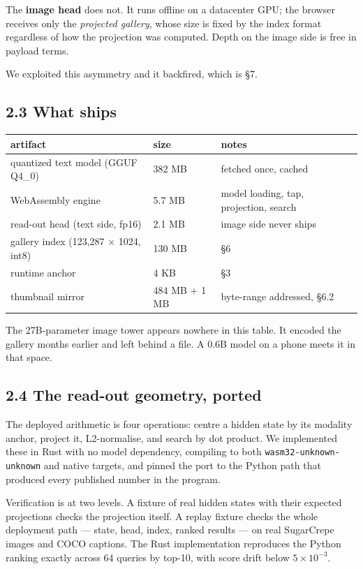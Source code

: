 \documentclass[
  11pt,
]{article}
\newcounter{none} %
\begin{document}
The \textbf{image head} does not. It runs offline on a datacenter GPU;
the browser receives only the \emph{projected gallery}, whose size is
fixed by the index format regardless of how the projection was computed.
Depth on the image side is free in payload terms.

We exploited this asymmetry and it backfired, which is §7.

\subsection{2.3 What ships}\label{what-ships}

{\def\LTcaptype{none} %
\begin{longtable}[]{@{}lll@{}}
\toprule\noalign{}
artifact & size & notes \\
\midrule\noalign{}
\endhead
\bottomrule\noalign{}
\endlastfoot
quantized text model (GGUF Q4\_0) & 382 MB & fetched once, cached \\
WebAssembly engine & 5.7 MB & model loading, tap, projection, search \\
read-out head (text side, fp16) & 2.1 MB & image side never ships \\
gallery index (123,287 × 1024, int8) & 130 MB & §6 \\
runtime anchor & 4 KB & §3 \\
thumbnail mirror & 484 MB + 1 MB & byte-range addressed, §6.2 \\
\end{longtable}
}

The 27B-parameter image tower appears nowhere in this table. It encoded
the gallery months earlier and left behind a file. A 0.6B model on a
phone meets it in that space.

\subsection{2.4 The read-out geometry,
ported}\label{the-read-out-geometry-ported}

The deployed arithmetic is four operations: centre a hidden state by its
modality anchor, project it, L2-normalise, and search by dot product. We
implemented these in Rust with no model dependency, compiling to both
\texttt{wasm32-unknown-unknown} and native targets, and pinned the port
to the Python path that produced every published number in the program.

Verification is at two levels. A fixture of real hidden states with
their expected projections checks the projection itself. A replay
fixture checks the whole deployment path --- state, head, index, ranked
results --- on real SugarCrepe images and COCO captions. The Rust
implementation reproduces the Python ranking exactly across 64 queries
by top-10, with score drift below \(5 \times 10^{-3}\).
\end{document}
